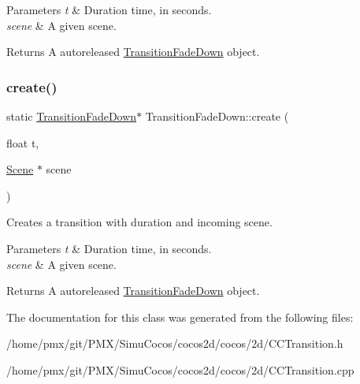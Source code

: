 \begin{DoxyParams}{Parameters}
{\em t} & Duration time, in seconds. \\
\hline
{\em scene} & A given scene. \\
\hline
\end{DoxyParams}
\begin{DoxyReturn}{Returns}
A autoreleased \hyperlink{classTransitionFadeDown}{Transition\+Fade\+Down} object. 
\end{DoxyReturn}
\mbox{\label{classTransitionFadeDown_afa49b3a7a85d5a0dd1e1e2533a11c63e}} 
\subsubsection{\texorpdfstring{create()}{create()}\hspace{0.1cm}{\footnotesize\ttfamily [2/2]}}
{\footnotesize\ttfamily static \hyperlink{classTransitionFadeDown}{Transition\+Fade\+Down}$\ast$ Transition\+Fade\+Down\+::create (\begin{DoxyParamCaption}\item[{float}]{t,  }\item[{\hyperlink{classScene}{Scene} $\ast$}]{scene }\end{DoxyParamCaption})\hspace{0.3cm}{\ttfamily [static]}}

Creates a transition with duration and incoming scene.


\begin{DoxyParams}{Parameters}
{\em t} & Duration time, in seconds. \\
\hline
{\em scene} & A given scene. \\
\hline
\end{DoxyParams}
\begin{DoxyReturn}{Returns}
A autoreleased \hyperlink{classTransitionFadeDown}{Transition\+Fade\+Down} object. 
\end{DoxyReturn}


The documentation for this class was generated from the following files\+:\begin{DoxyCompactItemize}
\item 
/home/pmx/git/\+P\+M\+X/\+Simu\+Cocos/cocos2d/cocos/2d/C\+C\+Transition.\+h\item 
/home/pmx/git/\+P\+M\+X/\+Simu\+Cocos/cocos2d/cocos/2d/C\+C\+Transition.\+cpp\end{DoxyCompactItemize}
